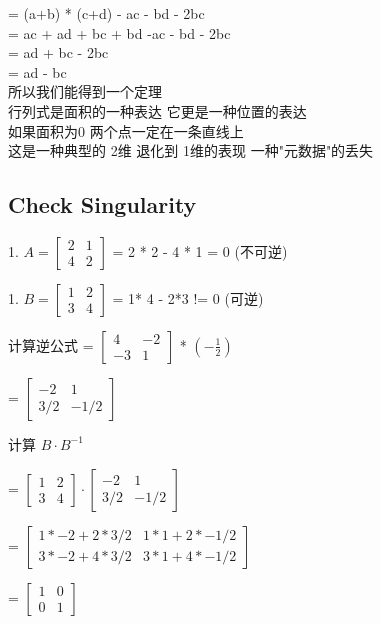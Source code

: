 \documentclass[12pt]{article}
\begin{document}
\begin{flushleft}
= (a+b) * (c+d) - ac - bd - 2bc  \\
=  ac  + ad  + bc + bd  -ac - bd - 2bc \\ 
= ad  + bc  - 2bc \\ 
= ad - bc \\

所以我们能得到一个定理 \\
行列式是面积的一种表达 它更是一种位置的表达 \\
如果面积为0 两个点一定在一条直线上 \\ 
这是一种典型的 2维 退化到 1维的表现 一种"元数据"的丢失 \\


\subsection* {Check Singularity}
1. $A = \begin{bmatrix}
    2 & 1 \\
    4 & 2 
\end{bmatrix}$
= 2 * 2 - 4 * 1 = 0 (不可逆)

1. $B = \begin{bmatrix}
    1 & 2 \\
    3 & 4 
\end{bmatrix}$
=  1* 4 - 2*3  != 0 (可逆)

计算逆公式
= $\begin{bmatrix}
    4 & -2 \\
   -3  & 1    
\end{bmatrix}$  * $(-\frac{1}{2})$

= $\begin{bmatrix}
    -2 & 1 \\
    3/2  & -1/2    
\end{bmatrix}$ 


计算 $B \cdot B^{-1}$

= $\begin{bmatrix}
    1 & 2 \\
    3 & 4 
\end{bmatrix}  \cdot \begin{bmatrix}
    -2 & 1 \\
    3/2  & -1/2    
\end{bmatrix}$

= $\begin{bmatrix}
    1 * -2  +  2 *  3/2  &  1 * 1  + 2 * -1/2 \\
    3 * -2  + 4 * 3/2  &  3* 1 + 4 * -1/2 
\end{bmatrix}$

= $\begin{bmatrix}
    1 & 0 \\
    0 & 1
\end{bmatrix}$
\end{flushleft}
\end{document}
